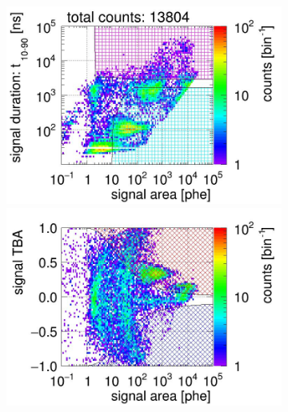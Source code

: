 \begin{landscape}%
	\begin{figure}[!p]
		\centering
		\begin{subfigure}[t]{0.32\textwidth} %
			\centering
			\includegraphics[width=\figurewidth,clip,trim={0 98 0 15}]{Figures/GasTest/CutsValid/res64766/pdpa22Vecfig64766.jpg}
			\includegraphics[width=\figurewidth,clip,trim={0 8 0 40}]{Figures/GasTest/CutsValid/res64766/tbapa22Vecfig64766.jpg}
			\caption{}
			\label{fig:signal selection dv 10 01}
		\end{subfigure}
		\begin{subfigure}[t]{0.32\textwidth}
			\centering

\end{subfigure}
\end{figure}
\end{landscape}
